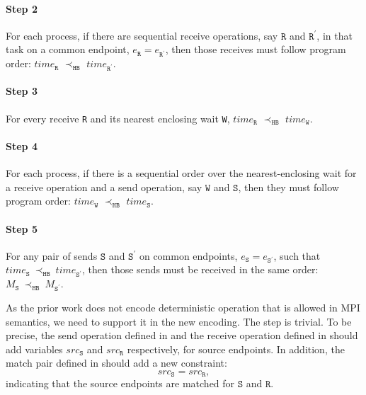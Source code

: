 \paragraph*{Step 2} For each process, if there are sequential receive
operations, say $\mathtt{R}$ and $\mathtt{R^\prime}$, in that task
on a common endpoint, $e_\mathtt{R} = e_\mathtt{R^\prime}$, then those
receives must follow program order: $\mathit{time}_\mathtt{R}$
$\prec_\mathtt{HB}$ $\mathit{time}_\mathtt{R^\prime}$.

\paragraph*{Step 3} For every receive \texttt{R} and its nearest
enclosing wait \texttt{W}, $\mathit{time}_\mathtt{R}$
$\prec_\mathtt{HB}$ $\mathit{time}_\mathtt{W}$.

\paragraph*{Step 4} For each process, if there is a sequential order over the nearest-enclosing wait for a receive operation and a send operation, say $\mathtt{W}$ and $\mathtt{S}$, then they must follow program order: $\mathit{time}_\mathtt{W}$
$\prec_\mathtt{HB}$ $\mathit{time}_\mathtt{S}$.

\paragraph*{Step 5} For any pair of sends $\mathtt{S}$ and
$\mathtt{S^\prime}$ on common endpoints, $e_{\mathtt{S}}=e_{\mathtt{S^\prime}}$,
such that
$\mathit{time}_\mathtt{S}\ \mathrm{\prec_\mathtt{HB}}\ \mathit{time}_\mathtt{S^\prime}$,
then those sends must be received in the same order:
$M_{\mathtt{S}}\ \mathrm{\prec_{\mathtt{HB}}}\ M_{\mathtt{S^\prime}}$.

As the prior work does not encode deterministic operation that is allowed in MPI semantics, we need to support it in the new encoding. The step is trivial. To be precise, the send operation defined in  and the receive operation defined in  should add variables $src_\mathtt{S}$ and $src_\mathtt{R}$ respectively, for source endpoints. In addition, the match pair defined in  should add a new constraint: 
\begin{equation*}
src_\mathtt{S} = src_\mathtt{R}, 
\end{equation*}
indicating that the source endpoints are matched for $\mathtt{S}$ and $\mathtt{R}$.

